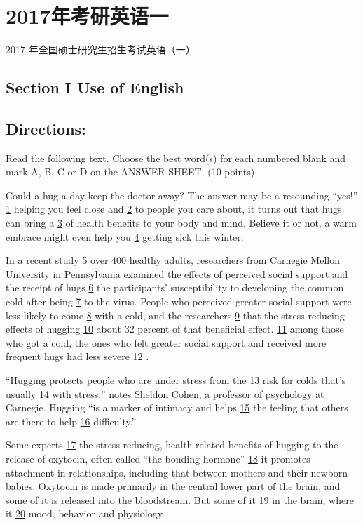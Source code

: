\documentclass[UTF8,11pt]{ctexart}
\begin{document}
\section*{2017年考研英语一}
2017 年全国硕士研究生招生考试英语（一）


\subsection*{\textbf{Section I Use of English}}


\subsection*{\textbf{Directions:}}


Read the following text. Choose the best word(s) for each numbered blank and mark A, B, C or D on the ANSWER SHEET. (10 points)


Could a hug a day keep the doctor away? The answer may be a resounding “yes!” \uline{1} helping you feel close and \uline{2} to people you care about, it turns out that hugs can bring a \uline{3} of health benefits to your body and mind. Believe it or not, a warm embrace might even help you \uline{4} getting sick this winter.


In a recent study \uline{5} over 400 healthy adults, researchers from Carnegie Mellon University in Pennsylvania examined the effects of perceived social support and the receipt of hugs \uline{6} the participants’ susceptibility to developing the common cold after being \uline{7} to the virus. People who perceived greater social support were less likely to come \uline{8} with a cold, and the researchers \uline{9} that the stress-reducing effects of hugging \uline{10} about 32 percent of that beneficial effect. \uline{11} among those who got a cold, the ones who felt greater social support and received more frequent hugs had less severe \uline{12 }.


“Hugging protects people who are under stress from the \uline{13} risk for colds that’s usually \uline{14} with stress,” notes Sheldon Cohen, a professor of psychology at Carnegie. Hugging “is a marker of intimacy and helps \uline{15} the feeling that others are there to help \uline{16} difficulty.”


Some experts \uline{17} the stress-reducing, health-related benefits of hugging to the release of oxytocin, often called “the bonding hormone” \uline{18} it promotes attachment in relationships, including that between mothers and their newborn babies. Oxytocin is made primarily in the central lower part of the brain, and some of it is released into the bloodstream. But some of it \uline{19} in the brain, where it \uline{20} mood, behavior and physiology.
\end{document}
